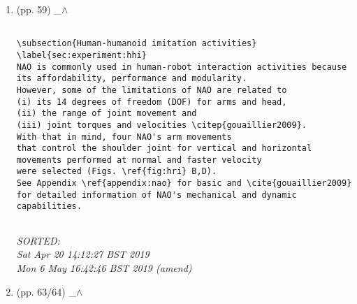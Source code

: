 \documentclass[12pt]{article}
\begin{document}
\begin{enumerate}

\item  (pp. 59)  \_$\wedge$  

	\begin{verbatim}

\subsection{Human-humanoid imitation activities} \label{sec:experiment:hhi}
NAO is commonly used in human-robot interaction activities because 
its affordability, performance and modularity.
However, some of the limitations of NAO are related to 
(i) its 14 degrees of freedom (DOF) for arms and head,
(ii) the range of joint movement and 
(iii) joint torques and velocities \citep{gouaillier2009}. 
With that in mind, four NAO's arm movements 
that control the shoulder joint for vertical and horizontal
movements performed at normal and faster velocity 
were selected (Figs. \ref{fig:hri} B,D).
See Appendix \ref{appendix:nao} for basic and \cite{gouaillier2009}
for detailed information of NAO's mechanical and dynamic capabilities. 
	
	\end{verbatim}
	\textit{
	SORTED: \\
	Sat Apr 20 14:12:27 BST 2019 \\
	 Mon  6 May 16:42:46 BST 2019 (amend) 
	}
	\\









\item  (pp. 63/64)  \_$\wedge$  


%
%
%



\end{enumerate}
\end{document}

